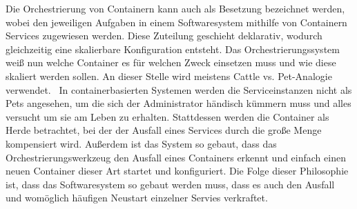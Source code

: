 Die Orchestrierung von Containern kann auch als Besetzung bezeichnet werden, wobei den jeweiligen Aufgaben in einem Softwaresystem mithilfe von Containern Services zugewiesen werden.
Diese Zuteilung geschieht deklarativ, wodurch gleichzeitig eine skalierbare Konfiguration entsteht.
Das Orchestrierungssystem weiß nun welche Container es für welchen Zweck einsetzen muss und wie diese skaliert werden sollen. An dieser Stelle wird meistens Cattle vs. Pet-Analogie verwendet.~\autocite{pets-vs-cattle:online}
In containerbasierten Systemen werden die Serviceinstanzen nicht als Pets angesehen, um die sich der Administrator händisch kümmern muss und alles versucht um sie am Leben zu erhalten.
Stattdessen werden die Container als Herde betrachtet, bei der der Ausfall eines Services durch die große Menge kompensiert wird.
Außerdem ist das System so gebaut, dass das Orchestrierungswerkzeug den Ausfall eines Containers erkennt und einfach einen neuen Container dieser Art startet und konfiguriert.
Die Folge dieser Philosophie ist, dass das Softwaresystem so gebaut werden muss, dass es auch den Ausfall und womöglich häufigen Neustart einzelner Servies verkraftet.

